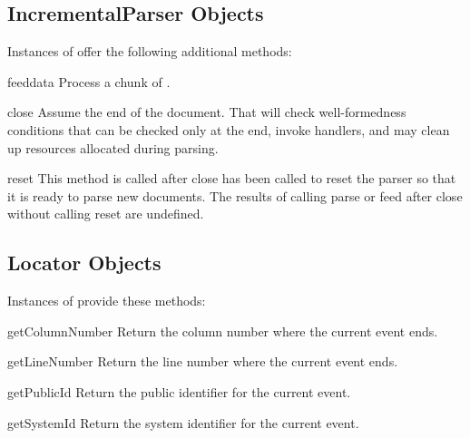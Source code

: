 \subsection{IncrementalParser Objects
            \label{incremental-parser-objects}}

Instances of  offer the following additional
methods:

\begin{methoddesc}[IncrementalParser]{feed}{data}
  Process a chunk of .
\end{methoddesc}

\begin{methoddesc}[IncrementalParser]{close}{}
  Assume the end of the document. That will check well-formedness
  conditions that can be checked only at the end, invoke handlers, and
  may clean up resources allocated during parsing.
\end{methoddesc}

\begin{methoddesc}[IncrementalParser]{reset}{}
  This method is called after close has been called to reset the
  parser so that it is ready to parse new documents. The results of
  calling parse or feed after close without calling reset are
  undefined.
\end{methoddesc}


\subsection{Locator Objects \label{locator-objects}}

Instances of  provide these methods:

\begin{methoddesc}[Locator]{getColumnNumber}{}
  Return the column number where the current event ends.
\end{methoddesc}

\begin{methoddesc}[Locator]{getLineNumber}{}
  Return the line number where the current event ends.
\end{methoddesc}

\begin{methoddesc}[Locator]{getPublicId}{}
  Return the public identifier for the current event.
\end{methoddesc}

\begin{methoddesc}[Locator]{getSystemId}{}
  Return the system identifier for the current event.
\end{methoddesc}


